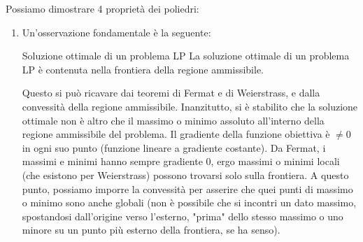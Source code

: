 \documentclass[a4paper,11pt]{article}
\begin{document}
Possiamo dimostrare 4 proprietà dei poliedri:

\begin{enumerate}
	\item 
		Un'osservazione fondamentale è la seguente:
		\begin{theorem}{Soluzione ottimale di un problema LP}
			La soluzione ottimale di un problema LP è contenuta nella frontiera della regione ammissibile.
		\end{theorem}
		Questo si può ricavare dai teoremi di Fermat e di Weierstrass, e dalla convessità della regione ammissibile.
		Inanzitutto, si è stabilito che la soluzione ottimale non è altro che il massimo o minimo assoluto all'interno della regione ammissibile del problema.
		Il gradiente della funzione obiettiva è $\neq 0$ in ogni suo punto (funzione lineare a gradiente costante). 
		Da Fermat, i massimi e minimi hanno sempre gradiente $0$, ergo massimi o minimi locali (che esistono per Weierstrass) possono trovarsi solo sulla frontiera.
		A questo punto, possiamo imporre la convessità per asserire che quei punti di massimo o minimo sono anche globali (non è possibile che si incontri un dato massimo, spostandosi dall'origine verso l'esterno, "prima" dello stesso massimo o uno minore su un punto più esterno della frontiera, se ha senso). 


\end{enumerate}
\end{document}
